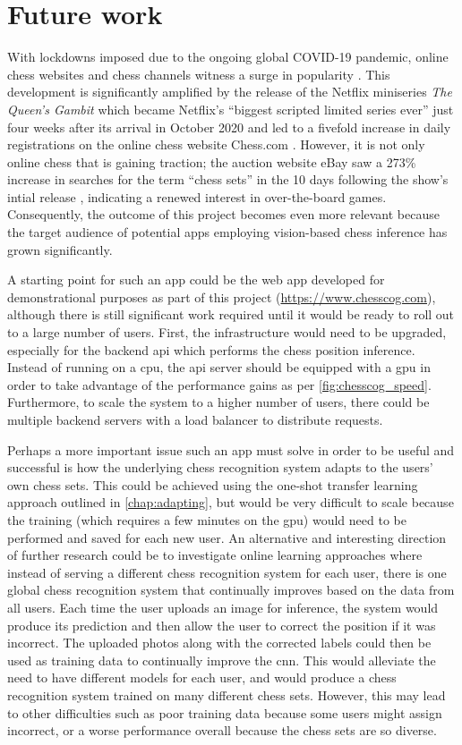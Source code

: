 \documentclass[../report.tex]{subfiles}
\begin{document}
\section{Future work}
With lockdowns imposed due to the ongoing global COVID-19 pandemic, online chess websites and chess channels witness a surge in popularity \cite{dottle2020}.
This development is significantly amplified by the release of the Netflix miniseries \textit{The Queen's Gambit} which became Netflix's ``biggest scripted limited series ever'' \cite{friedlander2020} just four weeks after its arrival in October 2020 and led to a fivefold increase in daily registrations on the online chess website Chess.com \cite{dottle2020}.
However, it is not only online chess that is gaining traction; the auction website eBay saw a 273\% increase in searches for the term ``chess sets'' in the 10 days following the show's intial release \cite{young2020}, indicating a renewed interest in over-the-board games.
Consequently, the outcome of this project becomes even more relevant because the target audience of potential apps employing vision-based chess inference has grown significantly.

A starting point for such an app could be the web app developed for demonstrational purposes as part of this project (\url{https://www.chesscog.com}), although there is still significant work required until it would be ready to roll out to a large number of users.
First, the infrastructure would need to be upgraded, especially for the backend \gls{api} which performs the chess position inference.
Instead of running on a \gls{cpu}, the \gls{api} server should be equipped with a \gls{gpu} in order to take advantage of the performance gains as per \cref{fig:chesscog_speed}.
Furthermore, to scale the system to a higher number of users, there could be multiple backend servers with a load balancer to distribute requests.

Perhaps a more important issue such an app must solve in order to be useful and successful is how the underlying chess recognition system adapts to the users' own chess sets.
This could be achieved using the one-shot transfer learning approach outlined in \cref{chap:adapting}, but would be very difficult to scale because the training (which requires a few minutes on the \gls{gpu}) would need to be performed and saved for each new user.
An alternative and interesting direction of further research could be to investigate online learning approaches where instead of serving a different chess recognition system for each user, there is one global chess recognition system that continually improves based on the data from all users.
Each time the user uploads an image for inference, the system would produce its prediction and then allow the user to correct the position if it was incorrect.
The uploaded photos along with the corrected labels could then be used as training data to continually improve the \gls{cnn}.
This would alleviate the need to have different models for each user, and would produce a chess recognition system trained on many different chess sets.
However, this may lead to other difficulties such as poor training data because some users might assign incorrect, or a worse performance overall because the chess sets are so diverse.
\end{document}
